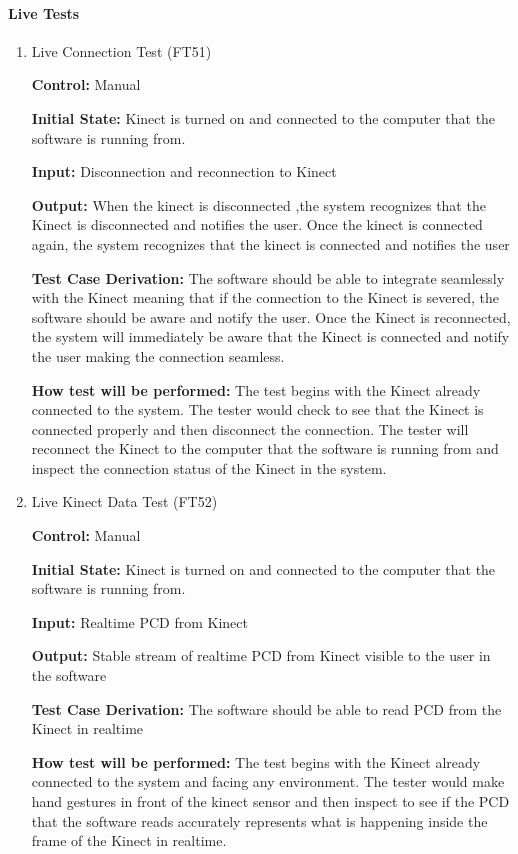 \documentclass[12pt, titlepage]{article}
\begin{document}
\paragraph{Live Tests}
\begin{enumerate}
\item{Live Connection Test (FT51)}
  
\textbf{Control:} Manual

\textbf{Initial State:} Kinect is turned on and connected to the computer that the software is running from. 

\textbf{Input:} Disconnection and reconnection to Kinect

\textbf{Output:} When the kinect is disconnected ,the system recognizes that the Kinect is disconnected and notifies the user. Once the kinect is connected again, the system recognizes that the kinect is connected and notifies the user

\textbf{Test Case Derivation:} The software should be able to integrate seamlessly with the Kinect meaning that if the connection to the Kinect is severed, the software should be aware and notify the user. Once the Kinect is reconnected, the system will immediately be aware that the Kinect is connected and notify the user making the connection seamless.

\textbf{How test will be performed:} The test begins with the Kinect already connected to the system. The tester would check to see that the Kinect is connected properly and then disconnect the connection. The tester will reconnect the Kinect to the computer that the software is running from and inspect the connection status of the Kinect in the system.

\item{Live Kinect Data Test (FT52)}

\textbf{Control:} Manual

\textbf{Initial State:} Kinect is turned on and connected to the computer that the software is running from. 

\textbf{Input:} Realtime PCD from Kinect

\textbf{Output:} Stable stream of realtime PCD from Kinect visible to the user in the software

\textbf{Test Case Derivation:} The software should be able to read PCD from the Kinect in realtime

\textbf{How test will be performed:} The test begins with the Kinect already connected to the system and facing any environment. The tester would make hand gestures in front of the kinect sensor and then inspect to see if the PCD that the software reads accurately represents what is happening inside the frame of the Kinect in realtime.

\end{enumerate} 
\end{document}
